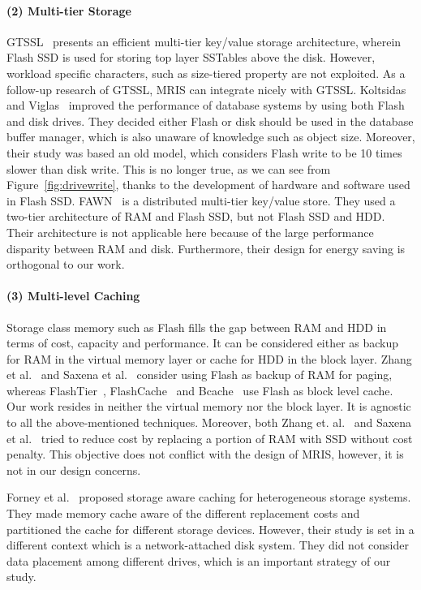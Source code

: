 \paragraph{(2) Multi-tier Storage}
%
GTSSL~\cite{socc11chisl} presents an efficient multi-tier key/value
storage architecture, wherein Flash SSD is used for storing top layer
SSTables above the disk. However, workload specific characters, such as
size-tiered property are not exploited. As a follow-up research of
GTSSL, MRIS can integrate nicely with GTSSL. Koltsidas and
Viglas~\cite{vldb_flashup} improved the performance of database
systems by using both Flash and disk drives. They decided either Flash
or disk should be used in the database buffer manager, which is also
unaware of knowledge such as object size. Moreover, their study was
based an old model, which considers Flash write to be 10 times slower
than disk write. This is no longer true, as we can see from
Figure~\ref{fig:drivewrite}, thanks to the development of hardware and
software used in Flash SSD. FAWN~\cite{sosp09fawn} is a distributed
multi-tier key/value store. They used a two-tier architecture of RAM
and Flash SSD, but not Flash SSD and HDD. Their architecture is not
applicable here because of the large performance disparity between RAM
and disk. Furthermore, their design for energy saving is orthogonal to
our work.

\paragraph{(3) Multi-level Caching}
%
Storage class memory such as Flash fills the gap between RAM and HDD
in terms of cost, capacity and performance. It can be considered
either as backup for RAM in the virtual memory layer or cache for HDD
in the block layer. Zhang et al.~\cite{zhang2012multi} and Saxena et
al.~\cite{flashvm} consider using Flash as backup of RAM for paging,
whereas FlashTier~\cite{eurosys_12_flashtier},
FlashCache~\cite{flashcache} and Bcache~\cite{bcache} use Flash as
block level cache. Our work resides in neither the virtual memory nor
the block layer. It is agnostic to all the above-mentioned techniques.
Moreover, both Zhang et. al.~\cite{zhang2012multi} and Saxena et
al.~\cite{flashvm} tried to reduce cost by replacing a portion of RAM
with SSD without cost penalty. This objective does not conflict with
the design of MRIS, however, it is not in our design concerns.

Forney et al.~\cite{Forney2002fast} proposed storage aware caching for
heterogeneous storage systems. They made memory cache aware of the
different replacement costs and partitioned the cache for different
storage devices.  However, their study is set in a different context
which is a network-attached disk system.  They did not consider data
placement among different drives, which is an important strategy of
our study.

